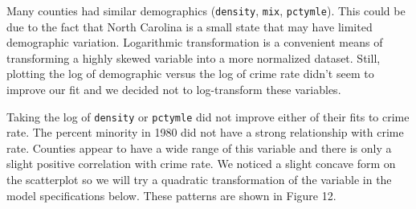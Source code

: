 \documentclass[]{article}
\begin{document}
Many counties had similar demographics (\texttt{density}, \texttt{mix},
\texttt{pctymle}). This could be due to the fact that North Carolina is
a small state that may have limited demographic variation. Logarithmic
transformation is a convenient means of transforming a highly skewed
variable into a more normalized dataset. Still, plotting the log of
demographic versus the log of crime rate didn't seem to improve our fit
and we decided not to log-transform these variables.

Taking the log of \texttt{density} or \texttt{pctymle} did not improve
either of their fits to crime rate. The percent minority in 1980 did not
have a strong relationship with crime rate. Counties appear to have a
wide range of this variable and there is only a slight positive
correlation with crime rate. We noticed a slight concave form on the
scatterplot so we will try a quadratic transformation of the variable in
the model specifications below. These patterns are shown in Figure 12.
\end{document}
